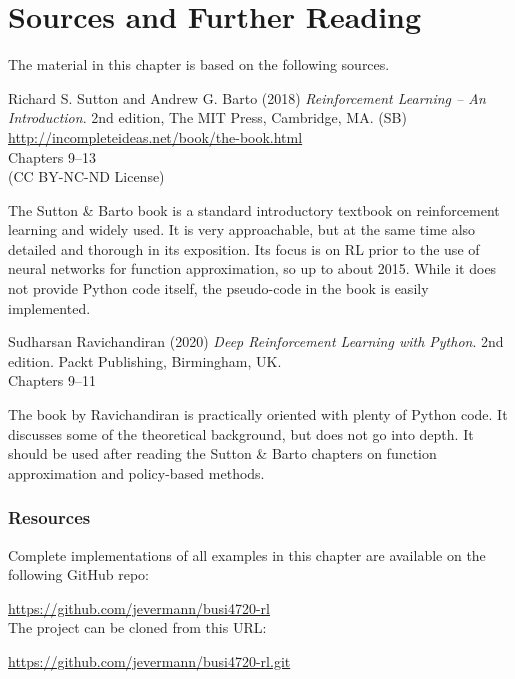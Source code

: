 %
%
\section*{Sources and Further Reading}

The material in this chapter is based on the following sources. 

\begin{tcolorbox}[colback=alert]
Richard S. Sutton and Andrew G. Barto (2018) \emph{Reinforcement Learning -- An Introduction}. 2nd edition, The MIT Press, Cambridge, MA. (SB) \\
\vspace{0.5\baselineskip}
\url{http://incompleteideas.net/book/the-book.html} \\
\vspace{0.5\baselineskip}
Chapters 9--13 \\
\vspace{0.5\baselineskip}
(CC BY-NC-ND License)
\end{tcolorbox}

The Sutton \& Barto book is a standard introductory textbook on reinforcement learning and widely used. It is very approachable, but at the same time also detailed and thorough in its exposition. Its focus is on RL prior to the use of neural networks for function approximation, so up to about 2015. While it does not provide Python code itself, the pseudo-code in the book is easily implemented.


\begin{tcolorbox}[colback=alert]
Sudharsan Ravichandiran (2020) \emph{Deep Reinforcement Learning with Python}. 2nd edition. Packt Publishing, Birmingham, UK. \\
\vspace{0.5\baselineskip}
Chapters 9--11
\end{tcolorbox}

The book by Ravichandiran is practically oriented with plenty of Python code. It discusses some of the theoretical background, but does not go into depth. It should be used after reading the Sutton \& Barto chapters on function approximation and policy-based methods.


\begin{tcolorbox}[colback=alert]
\subsubsection*{Resources}
Complete implementations of all examples in this chapter are available on the following GitHub repo:

\url{https://github.com/jevermann/busi4720-rl} \\

The project can be cloned from this URL:

\url{https://github.com/jevermann/busi4720-rl.git}
\end{tcolorbox}


